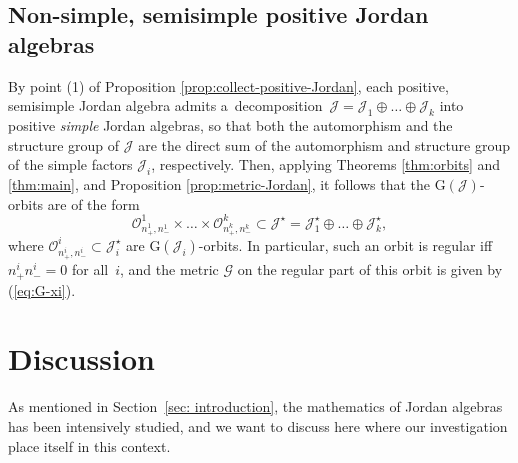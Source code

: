 \documentclass[10pt,a4paper]{amsart}
\numberwithin{equation}{section}
\newcommand{\ocal}{\mathcal{O}}
\newcommand{\Jcal}{\mathcal{J}}
\newcommand{\G}{\mathrm{G}}
\newcommand{\Gcal}{\mathcal{G}}
\begin{document}
\subsection{Non-simple, semisimple positive Jordan algebras}

By point (1) of Proposition \ref{prop:collect-positive-Jordan}, each positive, semisimple Jordan algebra admits a~decomposition~$\Jcal = \Jcal_1 \oplus \dots \oplus \Jcal_k$ into positive {\em simple }Jordan algebras, so that both the automorphism and the structure group of $\Jcal$ are the direct sum of the automorphism and structure group of the simple factors $\Jcal_i$, respectively.
Then, applying Theorems \ref{thm:orbits} and \ref{thm:main}, and Proposition \ref{prop:metric-Jordan}, it follows that the $\G(\Jcal)$-orbits are of the form
\[
\ocal^1_{n^1_+, n^1_-} \times \dots \times \ocal^k_{n^k_+, n^k_-} \subset \Jcal^\star = \Jcal_1^\star \oplus \dots \oplus \Jcal^\star_k,
\]
where $\ocal^i_{n^i_+, n^i_-} \subset \Jcal^\star_i$ are $\G(\Jcal_i)$-orbits. In particular, such an orbit is regular iff $n^i_+ n^i_- = 0$ for all~$i$, and the metric $\Gcal$ on the regular part of this orbit is given by (\ref{eq:G-xi}).



\section{Discussion} \label{sec: conclusions}

As mentioned in Section~\ref{sec: introduction}, the mathematics of Jordan algebras has been intensively studied, and we want to discuss here where our investigation place itself in this context.
\end{document}
